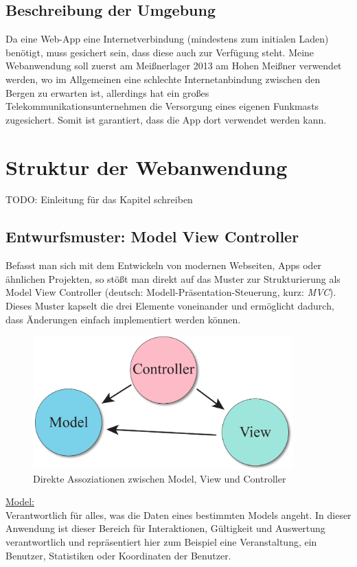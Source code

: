 \subsection{Beschreibung der Umgebung}
Da eine Web-App eine Internetverbindung (mindestens zum initialen Laden) benötigt, muss gesichert sein, dass diese auch zur Verfügung steht. Meine Webanwendung soll zuerst am Meißnerlager 2013 am Hohen Meißner verwendet werden, wo im Allgemeinen eine schlechte Internetanbindung zwischen den Bergen zu erwarten ist, allerdings hat ein großes Telekommunikationsunternehmen die Versorgung eines eigenen Funkmasts zugesichert. Somit ist garantiert, dass die App dort verwendet werden kann.

\section{Struktur der Webanwendung}
TODO: Einleitung für das Kapitel schreiben

\subsection{Entwurfsmuster: Model View Controller}

Befasst man sich mit dem Entwickeln von modernen Webseiten, Apps oder ähnlichen Projekten, so stößt man direkt auf das Muster zur Strukturierung als Model View Controller (deutsch: Modell-Präsentation-Steuerung, kurz: \emph{MVC}). Dieses Muster kapselt die drei Elemente voneinander und ermöglicht dadurch, dass Änderungen einfach implementiert werden können.

\begin{figure}[!ht]
	\centering
	\includegraphics[width=10cm]{fig/mvc}
	\caption{Direkte Assoziationen zwischen Model, View und Controller}
\end{figure}

\underline{Model:}\\
Verantwortlich für alles, was die Daten eines bestimmten Models angeht. In dieser Anwendung ist dieser Bereich für Interaktionen, Gültigkeit und Auswertung verantwortlich und repräsentiert hier zum Beispiel eine Veranstaltung, ein Benutzer, Statistiken oder Koordinaten der Benutzer.

